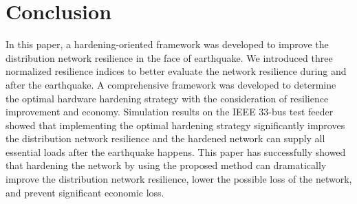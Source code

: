 \documentclass[conference]{IEEEtran}
\begin{document}
\section{Conclusion}
In this paper, a hardening-oriented framework was developed to improve the distribution network resilience in the face of earthquake. We introduced three normalized resilience indices to better evaluate the network resilience during and after the earthquake. A comprehensive framework was developed to determine the optimal hardware hardening strategy with the consideration of resilience improvement and economy. Simulation results on the IEEE 33-bus test feeder showed that implementing the optimal hardening strategy significantly improves the distribution network resilience and the hardened network can supply all essential loads after the earthquake happens. This paper has successfully showed that hardening the network by using the proposed method can dramatically improve the distribution network resilience, lower the possible loss of the network, and prevent significant economic loss. %





\end{document}
